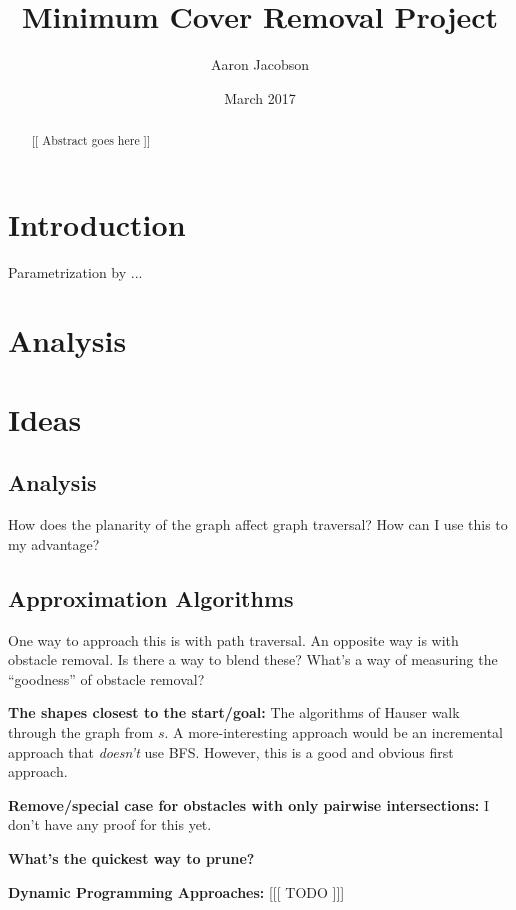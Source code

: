 \documentclass{amsart}
\begin{document}
{\Large

\title{Minimum Cover Removal Project}
\author{Aaron Jacobson}
\date{March 2017}
\maketitle

\begin{abstract}
[[ Abstract goes here ]]
\end{abstract}

\section{Introduction}

Parametrization by ...

\section{Analysis}

\section{Ideas}

\subsection{Analysis}

How does the planarity of the graph affect graph traversal? How can I use this to my advantage?

\subsection{Approximation Algorithms}

One way to approach this is with path traversal. An opposite way is with obstacle removal. Is there a way to blend these? What's a way of measuring the ``goodness'' of obstacle removal?

\textbf{The shapes closest to the start/goal:} The algorithms of Hauser walk through the graph from $s$. A more-interesting approach would be an incremental approach that \emph{doesn't} use BFS. However, this is a good and obvious first approach.

\textbf{Remove/special case for obstacles with only pairwise intersections:} I don't have any proof for this yet.

\textbf{What's the quickest way to prune?}

\textbf{Dynamic Programming Approaches:} [[[ TODO ]]]

}
\end{document}
